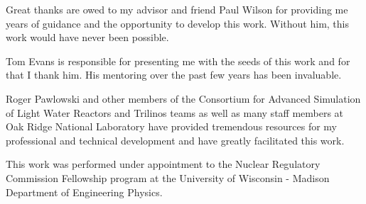 Great thanks are owed to my advisor and friend Paul Wilson for
providing me years of guidance and the opportunity to develop this
work. Without him, this work would have never been possible.

Tom Evans is responsible for presenting me with the seeds of this work
and for that I thank him. His mentoring over the past few years has
been invaluable.

Roger Pawlowski and other members of the Consortium for Advanced
Simulation of Light Water Reactors and Trilinos teams as well as many
staff members at Oak Ridge National Laboratory have provided
tremendous resources for my professional and technical development and
have greatly facilitated this work.

This work was performed under appointment to the Nuclear Regulatory
Commission Fellowship program at the University of Wisconsin - Madison
Department of Engineering Physics.
